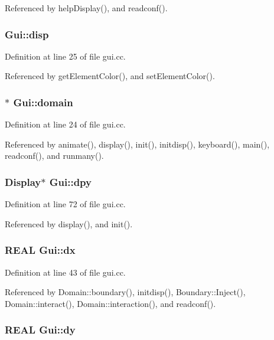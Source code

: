 Referenced by helpDisplay(), and readconf().\hypertarget{namespaceGui_a3da3aa4111d6dc26f3f40324c8f52d3}{
\subsubsection[{disp}]{ {\bf Gui::disp}}}
\label{namespaceGui_a3da3aa4111d6dc26f3f40324c8f52d3}




Definition at line 25 of file gui.cc.

Referenced by getElementColor(), and setElementColor().\hypertarget{namespaceGui_60f6d8ae2497f90f2e3bad7a69c27f1d}{
\subsubsection[{domain}]{$\ast$ {\bf Gui::domain}}}
\label{namespaceGui_60f6d8ae2497f90f2e3bad7a69c27f1d}




Definition at line 24 of file gui.cc.

Referenced by animate(), display(), init(), initdisp(), keyboard(), main(), readconf(), and runmany().\hypertarget{namespaceGui_7cffe1d85006be54ecc4edc51a9978be}{
\subsubsection[{dpy}]{\setlength{\rightskip}{0pt plus 5cm}Display$\ast$ {\bf Gui::dpy}}}
\label{namespaceGui_7cffe1d85006be54ecc4edc51a9978be}




Definition at line 72 of file gui.cc.

Referenced by display(), and init().\hypertarget{namespaceGui_447643e9fc2878cea10d5d51fe076fd8}{
\subsubsection[{dx}]{\setlength{\rightskip}{0pt plus 5cm}REAL {\bf Gui::dx}}}
\label{namespaceGui_447643e9fc2878cea10d5d51fe076fd8}




Definition at line 43 of file gui.cc.

Referenced by Domain::boundary(), initdisp(), Boundary::Inject(), Domain::interact(), Domain::interaction(), and readconf().\hypertarget{namespaceGui_9f9c724776b5bb133fbb54fbbaad8b6b}{
\subsubsection[{dy}]{\setlength{\rightskip}{0pt plus 5cm}REAL {\bf Gui::dy}}}
\label{namespaceGui_9f9c724776b5bb133fbb54fbbaad8b6b}




